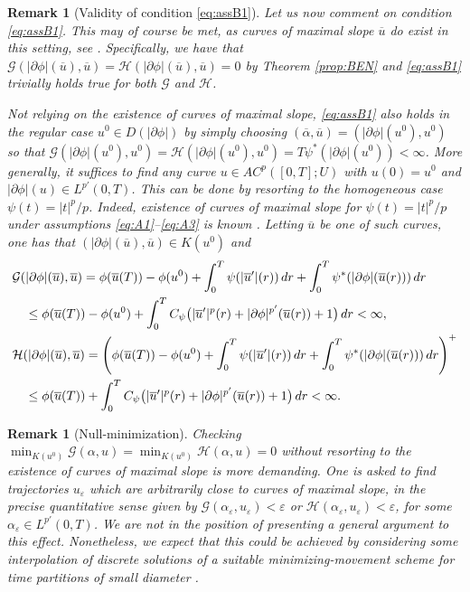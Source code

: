 \documentclass[10pt,a4paper]{amsart}
\newcommand{\epsi}{\varepsilon}
\newcommand{\dr}{{\rm d} r}
\newcommand{\ove}{\overline}
\renewcommand{\sl}{|\partial \phi|}
\newcommand{\GG}{{\mathcal G}}
\newcommand{\HH}{{\mathcal H}}
\renewcommand{\d}{{\rm d}}
\newtheorem{remark}[theorem]{Remark}
\begin{document}
\begin{remark}[Validity of condition \eqref{eq:assB1}]
   Let us now comment on condition \eqref{eq:assB1}. This may of
  course  be met,  as curves of maximal slope $\ove u$ do exist in this setting,  see \cite{cuore3}.  Specifically, we have that
  $\GG (\sl(\ove u),\ove u) = \HH (\sl(\ove u),\ove u)=0$  by Theorem \ref{prop:BEN}  and
   \eqref{eq:assB1} trivially holds true  for both $\GG$ and
  $\HH$. 

  Not relying on the existence of curves of maximal slope,
  \eqref{eq:assB1} also holds in the regular case $u^0 \in D(\sl)$ by
  simply choosing $(\ove \alpha, \ove u)=(\sl (u^0),u^0)$ so that
  $\GG (\sl (u^0),u^0) = \HH(\sl (u^0),u^0) =T
  \psi^*(\sl(u^0))<\infty$. More generally, it suffices to find any
  curve $u \in AC^p([0,T];U)$ with $u(0)=u^0$ and
  $\sl (u)\in L^{p'}(0,T)$. This can be done by resorting to the
  homogeneous case $\psi(t)=|t|^p/p$. Indeed, existence of curves of
  maximal slope for $\psi(t)=|t|^p/p$ under assumptions
  \eqref{eq:A1}--\eqref{eq:A3} is known \cite[Rem.~3.2.5,
  p.~69]{Ambrosio08}.  Letting $\ove u$ be one of such curves, one has
  that $(\sl(\ove u),\ove u)\in K(u^0)$ and
  \begin{align*}
    &\GG (\sl(\ove u),\ove u) = \phi(\ove u(T)) - \phi(u^0) +
      \int_0^T\psi(|\ove u'|(r))\, \dr + \int_0^T
      \psi^*(\sl(\ove u(r)))\, \d r \\
    & \quad \leq \phi(\ove u(T)) - \phi(u^0) +
      \int_0^T C_\psi \big(  |\ove u'|^p(r) + \sl^{p'}(\ove u(r)) +1\big)\, \d
      r <\infty, \\
    & \HH (\sl(\ove u),\ove u) = \left(\phi(\ove u(T)) - \phi(u^0) +
      \int_0^T\psi(|\ove u'|(r))\, \dr + \int_0^T
      \psi^*(\sl(\ove u(r)))\, \d r\right)^+ \\
    & \quad  \leq \phi(\ove u(T)) +
      \int_0^T C_\psi \big(  |\ove u'|^p(r) + \sl^{p'}(\ove u(r)) +1\big)\, \d
      r <\infty.
  \end{align*}
\end{remark}
\begin{remark}[Null-minimization]
   Checking
  $\min_{K(u^0)}\GG(\alpha,u) = \min_{K(u^0)}\HH(\alpha,u) = 0$
  without resorting to the existence of curves of maximal slope 
  is
  more demanding. One is asked to find trajectories $u_\epsi$ which
  are arbitrarily close to curves of maximal slope, in the precise
quantitative sense given by
  $\GG ( \alpha_\epsi, u_\epsi)<\epsi$  or
  $ \HH ( \alpha_\epsi, u_\epsi)<\epsi$, for some $\alpha_\epsi \in
  L^{p'}(0,T)$. We are not in the
  position of presenting a general argument to this
  effect. Nonetheless, we expect that this could be achieved by
  considering some interpolation of discrete
  solutions of a suitable minimizing-movement scheme for time
  partitions of small diameter \cite{cuore3}. 
\end{remark}
 
\end{document}
